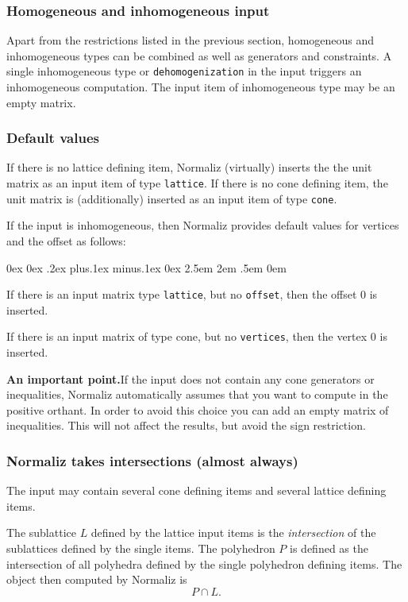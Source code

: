 \documentclass[12pt,a4paper]{scrartcl}
\newcounter{listi}
\newcommand{\stdli}{ \topsep0ex \partopsep0ex %
\parsep.2ex plus.1ex minus.1ex \itemsep0ex%
\leftmargin2.5em \labelwidth2em \labelsep.5em \rightmargin0em}%
\newenvironment{arab}{\begin{list}{\textup{(\arabic{listi})}}%
	{\usecounter{listi}\stdli}}{\end{list}}
\theoremstyle{definition}
\def\ttt{\texttt}
\begin{document}
\subsubsection{Homogeneous and inhomogeneous input}\label{inhom_inp}

Apart from the restrictions listed in the previous section, homogeneous and inhomogeneous types can be combined as well as generators and constraints. A single inhomogeneous type or \verb|dehomogenization| in the input triggers an inhomogeneous computation. The input item of inhomogeneous type may be an empty matrix.

\subsubsection{Default values}\label{default}

If there is no lattice defining item, Normaliz (virtually) inserts the the unit matrix as an input item of type \ttt{lattice}. If there is no cone defining item, the unit matrix is (additionally) inserted as an input item of type \ttt{cone}.

If the input is inhomogeneous, then Normaliz provides default values for vertices and the offset as follows:
\begin{arab}
	\item If there is an input matrix type \verb|lattice|, but no \ttt{offset}, then the offset $0$ is inserted.
	\item If there is an input matrix of type cone, but no \ttt{vertices}, then the vertex $0$ is inserted. 
\end{arab}

\textbf{An important point.}\enspace If the input does not contain any cone generators or inequalities, Normaliz automatically assumes that you want to compute in the positive orthant. In order to avoid this choice you can add an empty matrix of inequalities. This will not affect the results, but avoid the sign restriction.



\subsubsection{Normaliz takes intersections (almost always)}

The input may contain several cone defining items and several lattice defining items.

The sublattice $L$  defined by the lattice input items is the \emph{intersection} of the sublattices defined by the single items. The polyhedron $P$ is defined as the intersection of all polyhedra defined by the single  polyhedron defining items. The object then computed by Normaliz is
$$
P\cap L.
$$
\end{document}
